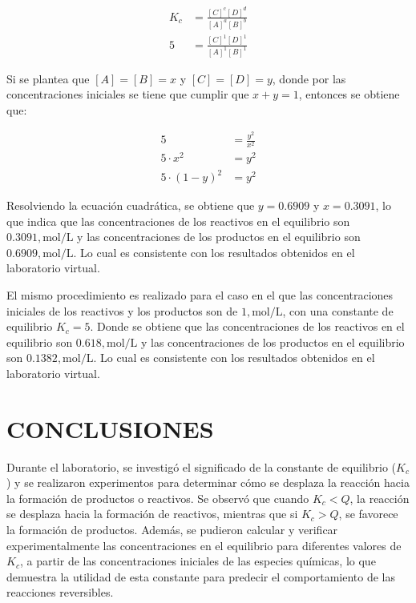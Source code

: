 \documentclass[10pt]{article}
\begin{document}
\begin{multicols*}{2}
        \begin{equation}
            \begin{split}
                K_c &= \frac{[C]^c[D]^d}{[A]^a[B]^b} \\
                5 &= \frac{[C]^1[D]^1}{[A]^1[B]^1}
            \end{split}
        \end{equation}

        Si se plantea que $[A] = [B] = x$ y $[C] = [D] = y$, donde por las concentraciones iniciales se tiene que cumplir que $x + y = 1$, entonces se obtiene que:

        \begin{equation}
            \begin{split}
                5 &= \frac{y^2}{x^2} \\
                5 \cdot x^2 &= y^2 \\
                5 \cdot (1 - y)^2 &= y^2
            \end{split}
        \end{equation}

        Resolviendo la ecuación cuadrática, se obtiene que $y = 0.6909$ y $x = 0.3091$, lo que indica que las concentraciones de los reactivos en el equilibrio son $0.3091 , \text{mol/L}$ y las concentraciones de los productos en el equilibrio son $0.6909 , \text{mol/L}$. Lo cual es consistente con los resultados obtenidos en el laboratorio virtual.

        El mismo procedimiento es realizado para el caso en el que las concentraciones iniciales de los reactivos y los productos son de $1 , \text{mol/L}$, con una constante de equilibrio $K_c = 5$. Donde se obtiene que las concentraciones de los reactivos en el equilibrio son $0.618 , \text{mol/L}$ y las concentraciones de los productos en el equilibrio son $0.1382 , \text{mol/L}$. Lo cual es consistente con los resultados obtenidos en el laboratorio virtual.

    \section{\small CONCLUSIONES}
        Durante el laboratorio, se investigó el significado de la constante de equilibrio ($K_c$) y se realizaron experimentos para determinar cómo se desplaza la reacción hacia la formación de productos o reactivos. Se observó que cuando $K_c < Q$, la reacción se desplaza hacia la formación de reactivos, mientras que si $K_c > Q$, se favorece la formación de productos. Además, se pudieron calcular y verificar experimentalmente las concentraciones en el equilibrio para diferentes valores de $K_c$, a partir de las concentraciones iniciales de las especies químicas, lo que demuestra la utilidad de esta constante para predecir el comportamiento de las reacciones reversibles.

    \nocite{giancoli}
    \nocite{montiel2015física}

    
    
\end{multicols*}
\end{document}
